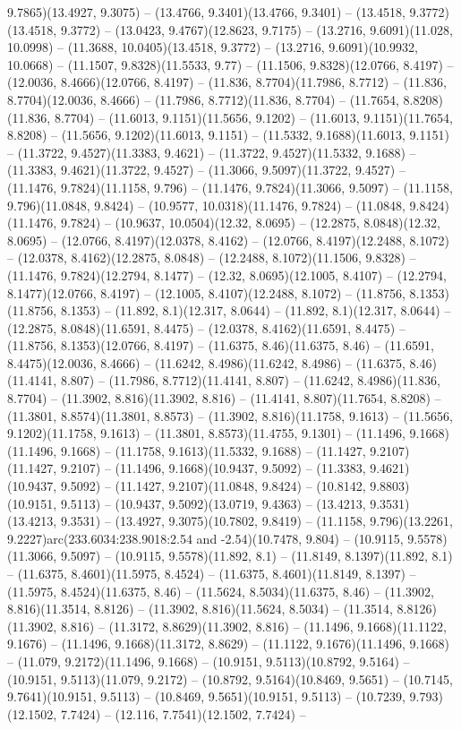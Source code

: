 9.7865)(13.4927, 9.3075) -- (13.4766, 9.3401)(13.4766, 9.3401) -- (13.4518, 9.3772)(13.4518, 9.3772) -- (13.0423, 9.4767)(12.8623, 9.7175) -- (13.2716, 9.6091)(11.028, 10.0998) -- (11.3688, 10.0405)(13.4518, 9.3772) -- (13.2716, 9.6091)(10.9932, 10.0668) -- (11.1507, 9.8328)(11.5533, 9.77) -- (11.1506, 9.8328)(12.0766, 8.4197) -- (12.0036, 8.4666)(12.0766, 8.4197) -- (11.836, 8.7704)(11.7986, 8.7712) -- (11.836, 8.7704)(12.0036, 8.4666) -- (11.7986, 8.7712)(11.836, 8.7704) -- (11.7654, 8.8208)(11.836, 8.7704) -- (11.6013, 9.1151)(11.5656, 9.1202) -- (11.6013, 9.1151)(11.7654, 8.8208) -- (11.5656, 9.1202)(11.6013, 9.1151) -- (11.5332, 9.1688)(11.6013, 9.1151) -- (11.3722, 9.4527)(11.3383, 9.4621) -- (11.3722, 9.4527)(11.5332, 9.1688) -- (11.3383, 9.4621)(11.3722, 9.4527) -- (11.3066, 9.5097)(11.3722, 9.4527) -- (11.1476, 9.7824)(11.1158, 9.796) -- (11.1476, 9.7824)(11.3066, 9.5097) -- (11.1158, 9.796)(11.0848, 9.8424) -- (10.9577, 10.0318)(11.1476, 9.7824) -- (11.0848, 9.8424)(11.1476, 9.7824) -- (10.9637, 10.0504)(12.32, 8.0695) -- (12.2875, 8.0848)(12.32, 8.0695) -- (12.0766, 8.4197)(12.0378, 8.4162) -- (12.0766, 8.4197)(12.2488, 8.1072) -- (12.0378, 8.4162)(12.2875, 8.0848) -- (12.2488, 8.1072)(11.1506, 9.8328) -- (11.1476, 9.7824)(12.2794, 8.1477) -- (12.32, 8.0695)(12.1005, 8.4107) -- (12.2794, 8.1477)(12.0766, 8.4197) -- (12.1005, 8.4107)(12.2488, 8.1072) -- (11.8756, 8.1353)(11.8756, 8.1353) -- (11.892, 8.1)(12.317, 8.0644) -- (11.892, 8.1)(12.317, 8.0644) -- (12.2875, 8.0848)(11.6591, 8.4475) -- (12.0378, 8.4162)(11.6591, 8.4475) -- (11.8756, 8.1353)(12.0766, 8.4197) -- (11.6375, 8.46)(11.6375, 8.46) -- (11.6591, 8.4475)(12.0036, 8.4666) -- (11.6242, 8.4986)(11.6242, 8.4986) -- (11.6375, 8.46)(11.4141, 8.807) -- (11.7986, 8.7712)(11.4141, 8.807) -- (11.6242, 8.4986)(11.836, 8.7704) -- (11.3902, 8.816)(11.3902, 8.816) -- (11.4141, 8.807)(11.7654, 8.8208) -- (11.3801, 8.8574)(11.3801, 8.8573) -- (11.3902, 8.816)(11.1758, 9.1613) -- (11.5656, 9.1202)(11.1758, 9.1613) -- (11.3801, 8.8573)(11.4755, 9.1301) -- (11.1496, 9.1668)(11.1496, 9.1668) -- (11.1758, 9.1613)(11.5332, 9.1688) -- (11.1427, 9.2107)(11.1427, 9.2107) -- (11.1496, 9.1668)(10.9437, 9.5092) -- (11.3383, 9.4621)(10.9437, 9.5092) -- (11.1427, 9.2107)(11.0848, 9.8424) -- (10.8142, 9.8803)(10.9151, 9.5113) -- (10.9437, 9.5092)(13.0719, 9.4363) -- (13.4213, 9.3531)(13.4213, 9.3531) -- (13.4927, 9.3075)(10.7802, 9.8419) -- (11.1158, 9.796)(13.2261, 9.2227)arc(233.6034:238.9018:2.54 and -2.54)(10.7478, 9.804) -- (10.9115, 9.5578)(11.3066, 9.5097) -- (10.9115, 9.5578)(11.892, 8.1) -- (11.8149, 8.1397)(11.892, 8.1) -- (11.6375, 8.4601)(11.5975, 8.4524) -- (11.6375, 8.4601)(11.8149, 8.1397) -- (11.5975, 8.4524)(11.6375, 8.46) -- (11.5624, 8.5034)(11.6375, 8.46) -- (11.3902, 8.816)(11.3514, 8.8126) -- (11.3902, 8.816)(11.5624, 8.5034) -- (11.3514, 8.8126)(11.3902, 8.816) -- (11.3172, 8.8629)(11.3902, 8.816) -- (11.1496, 9.1668)(11.1122, 9.1676) -- (11.1496, 9.1668)(11.3172, 8.8629) -- (11.1122, 9.1676)(11.1496, 9.1668) -- (11.079, 9.2172)(11.1496, 9.1668) -- (10.9151, 9.5113)(10.8792, 9.5164) -- (10.9151, 9.5113)(11.079, 9.2172) -- (10.8792, 9.5164)(10.8469, 9.5651) -- (10.7145, 9.7641)(10.9151, 9.5113) -- (10.8469, 9.5651)(10.9151, 9.5113) -- (10.7239, 9.793)(12.1502, 7.7424) -- (12.116, 7.7541)(12.1502, 7.7424) -- 